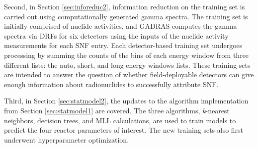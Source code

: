 
Second, in Section \ref{sec:inforeduc2}, information reduction on the training
set is carried out using computationally generated gamma spectra.  The training
set is initially comprised of nuclide activities, and \gls{GADRAS} computes the
gamma spectra via \gls{DRF}s for six detectors \cite{gadras} using the inputs
of the nuclide activity measurements for each \gls{SNF} entry.  Each
detector-based training set undergoes processing by summing the counts of the
bins of each energy window from three different lists: the auto, short, and
long energy windows lists.  These training sets are intended to answer the
question of whether field-deployable detectors can give enough information
about radionuclides to successfully attribute \gls{SNF}. 

Third, in Section \ref{sec:statmodel2}, the updates to the algorithm
implementation from Section \ref{sec:statmodel1} are covered. The three
algorithms, \textit{k}-nearest neighbors, decision trees, and \gls{MLL}
calculations, are used to train models to predict the four reactor parameters
of interest. The new training sets also first underwent hyperparameter
optimization.

